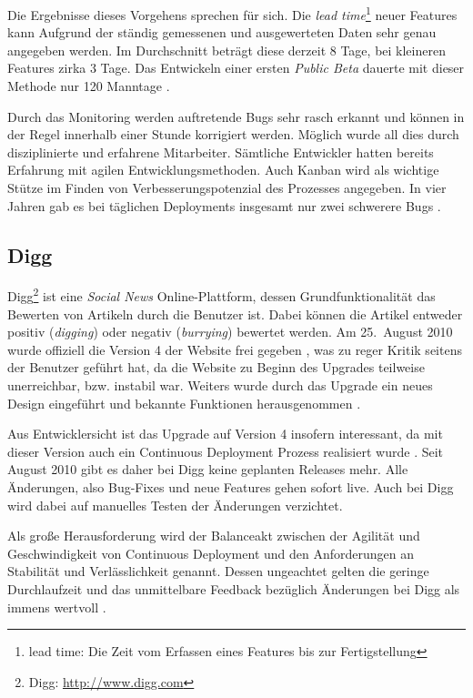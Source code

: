 Die Ergebnisse dieses Vorgehens sprechen für sich. Die \emph{lead
time}\footnote{lead time: Die Zeit vom Erfassen eines Features bis zur
Fertigstellung} neuer Features kann Aufgrund der ständig gemessenen und
ausgewerteten Daten sehr genau angegeben werden. Im Durchschnitt beträgt diese
derzeit 8 Tage, bei kleineren Features zirka 3 Tage. Das Entwickeln einer
ersten \emph{Public Beta} dauerte mit dieser Methode nur 120 Manntage
\cite{Taipale2010}.

Durch das Monitoring werden auftretende Bugs sehr rasch erkannt und können in
der Regel innerhalb einer Stunde korrigiert werden. Möglich wurde all dies
durch disziplinierte und erfahrene Mitarbeiter. Sämtliche Entwickler hatten
bereits Erfahrung mit agilen Entwicklungsmethoden. Auch Kanban wird als
wichtige Stütze im Finden von Verbesserungspotenzial des Prozesses angegeben.
In vier Jahren gab es bei täglichen Deployments insgesamt nur zwei schwerere
Bugs \cite{Taipale2010}.


\subsection{Digg}

Digg\footnote{Digg: \url{http://www.digg.com}} ist eine \emph{Social News}
Online-Plattform, dessen Grundfunktionalität das Bewerten von Artikeln durch
die Benutzer ist. Dabei können die Artikel entweder positiv (\emph{digging})
oder negativ (\emph{burrying}) bewertet werden. Am 25.~August 2010 wurde
offiziell die Version 4 der Website frei gegeben \cite{digg4-launch}, was zu
reger Kritik seitens der Benutzer geführt hat, da die Website zu Beginn des
Upgrades teilweise unerreichbar, bzw. instabil war. Weiters wurde durch das
Upgrade ein neues Design eingeführt und bekannte Funktionen herausgenommen
\cite{digg4-critics}.

Aus Entwicklersicht ist das Upgrade auf Version 4 insofern interessant, da mit
dieser Version auch ein Continuous Deployment Prozess realisiert wurde
\cite{digg4}. Seit August 2010 gibt es daher bei Digg keine geplanten Releases
mehr. Alle Änderungen, also Bug-Fixes und neue Features gehen sofort live.
Auch bei Digg wird dabei auf manuelles Testen der Änderungen verzichtet.

Als große Herausforderung wird der Balanceakt zwischen der Agilität und
Geschwindigkeit von Continuous Deployment und den Anforderungen an Stabilität
und Verlässlichkeit genannt. Dessen ungeachtet gelten die geringe
Durchlaufzeit und das unmittelbare Feedback bezüglich Änderungen bei Digg als
immens wertvoll \cite{digg4}.

